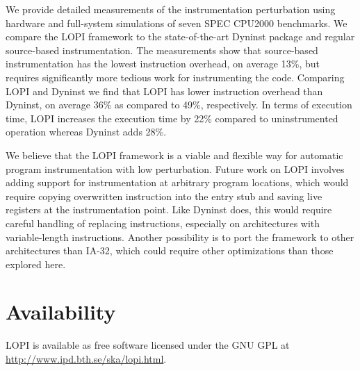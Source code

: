 We provide detailed measurements of the instrumentation perturbation using
hardware and full-system simulations of seven SPEC CPU2000 benchmarks. We
compare the LOPI framework to the state-of-the-art Dyninst package and regular
source-based instrumentation.  The measurements show that source-based
instrumentation has the lowest instruction overhead, on average 13\%, but
requires significantly more tedious work for instrumenting the code.
Comparing LOPI and Dyninst we find that LOPI has lower instruction overhead
than Dyninst, on average 36\% as compared to 49\%, respectively. In terms of
execution time, LOPI increases the execution time by 22\% compared to
uninstrumented operation whereas Dyninst adds 28\%.

We believe that the LOPI framework is a viable and flexible way for automatic
program instrumentation with low perturbation. Future work on LOPI involves
adding support for instrumentation at arbitrary program locations, which would
require copying overwritten instruction into the entry stub and saving live
registers at the instrumentation point. Like Dyninst does, this would require
careful handling of replacing instructions, especially on architectures with
variable-length instructions. Another possibility is to port the framework to
other architectures than IA-32, which could require other optimizations than
those explored here.

\section*{Availability}
\noindent
LOPI is available as free software licensed under the GNU GPL at
\url{http://www.ipd.bth.se/ska/lopi.html}.
